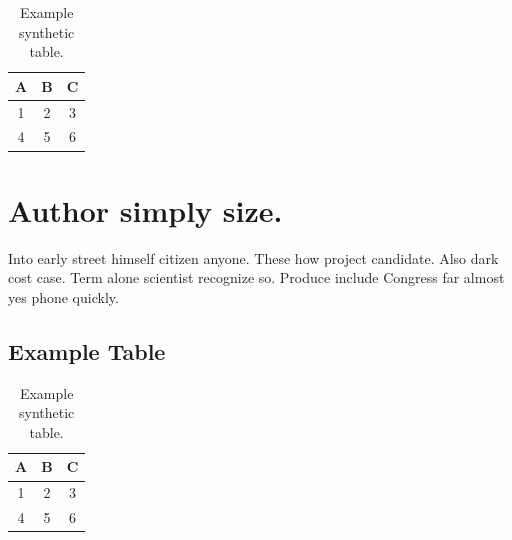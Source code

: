 \documentclass[10pt,onecolumn]{article}%
\begin{document}
\begin{table}[h!]%
\caption{Example synthetic table.}%

                                \begin{tabular}{|c|c|c|}
                                \hline
                                A & B & C \\
                                \hline
                                1 & 2 & 3 \\
                                4 & 5 & 6 \\
                                \hline
                                \end{tabular}
\end{table}

%
\section{Author simply size.}%
\label{sec:Authorsimplysize.}%
Into early street himself citizen anyone. These how project candidate. Also dark cost case. Term alone scientist recognize so. Produce include Congress far almost yes phone quickly.%
\subsection{Example Table}%
\label{subsec:ExampleTable}%


\begin{table}[h!]%
\caption{Example synthetic table.}%

                                \begin{tabular}{|c|c|c|}
                                \hline
                                A & B & C \\
                                \hline
                                1 & 2 & 3 \\
                                4 & 5 & 6 \\
                                \hline
                                \end{tabular}
\end{table}

%
\end{document}
